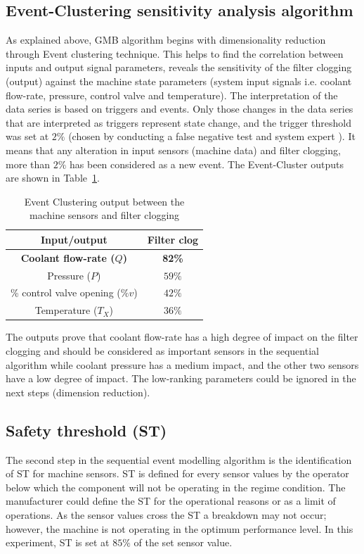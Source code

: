 \documentclass[conference]{IEEEtran}
\begin{document}
\subsection{Event-Clustering sensitivity analysis algorithm}
\label{subsec:event_clustering}
As explained above, GMB algorithm begins with dimensionality reduction through Event clustering technique. This helps to find the correlation between inputs and output signal parameters, reveals the sensitivity of the filter clogging (output) against the machine state parameters (system input signals i.e. coolant flow-rate, pressure, control valve and temperature). The interpretation of the data series is based on triggers and events. Only those changes in the data series that are interpreted as triggers represent state change, and the trigger threshold was set at $2\%$ (chosen by conducting a false negative test and system expert \cite{Tavakoli2013}). It means that any alteration in input sensors (machine data) and filter clogging, more than $2\%$ has been considered as a new event. The Event-Cluster outputs are shown in Table~\ref{tab:I}.
\begin{table}[b]
    \caption{Event Clustering output between the machine sensors and filter clogging}
    \begin{center}
        \begin{tabular}{|c|c|}
            \hline
            \textbf{Input/output}& \textbf{Filter clog} \\
            \hline
            \textbf{Coolant flow-rate ($Q$)} & \textbf{82\%}  \\
            \hline
            Pressure ($P$) & $59\%$ \\
            \hline
            \% control valve opening ($\%v$) & $42\%$ \\
            \hline
            Temperature ($T_X$) & $36\%$ \\
            \hline
        \end{tabular}
        \label{tab:I}
    \end{center}
\end{table}
The outputs prove that coolant flow-rate has a high degree of impact on the filter clogging and should be considered as important sensors in the sequential algorithm while coolant pressure has a medium impact, and the other two sensors have a low degree of impact. The low-ranking parameters could be ignored in the next steps (dimension reduction).

\subsection{Safety threshold (ST)}
\label{subsec:ST}
The second step in the sequential event modelling algorithm is the identification of ST for machine sensors. ST is defined for every sensor values by the operator below which the component will not be operating in the regime condition. The manufacturer could define the ST for the operational reasons or as a limit of operations. As the sensor values cross the ST a breakdown may not occur; however, the machine is not operating in the optimum performance level. In this experiment, ST is set at $85\%$ of the set sensor value.
\end{document}
